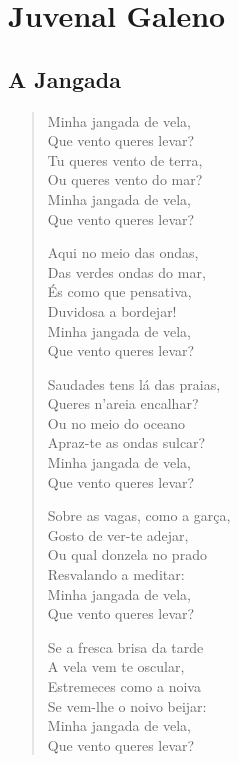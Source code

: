 \documentclass[10pt,a5paper,oneside]{book}
\begin{document}
\part{Juvenal Galeno}

\chapter{A Jangada}

\begin{verse}
Minha jangada de vela,\\
Que vento queres levar?\\
Tu queres vento de terra,\\
Ou queres vento do mar?\\
Minha jangada de vela,\\
Que vento queres levar?

Aqui no meio das ondas,\\
Das verdes ondas do mar,\\
És como que pensativa,\\
Duvidosa a bordejar!\\
Minha jangada de vela,\\
Que vento queres levar?

Saudades tens lá das praias,\\
Queres n'areia encalhar?\\
Ou no meio do oceano\\
Apraz-te as ondas sulcar?\\
Minha jangada de vela,\\
Que vento queres levar?

Sobre as vagas, como a garça,\\
Gosto de ver-te adejar,\\
Ou qual donzela no prado\\
Resvalando a meditar:\\
Minha jangada de vela,\\
Que vento queres levar?

Se a fresca brisa da tarde\\
A vela vem te oscular,\\
Estremeces como a noiva\\
Se vem-lhe o noivo beijar:\\
Minha jangada de vela,\\
Que vento queres levar?


\end{verse}
\end{document}
